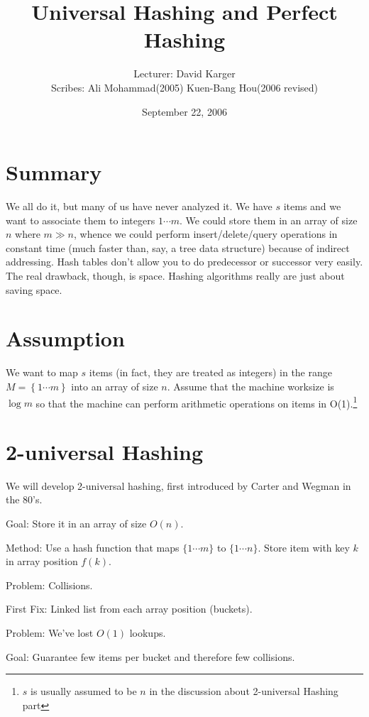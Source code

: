 \documentclass{article}
\begin{document}
\newcommand{\mod}{\hbox{mod }}

\title{Universal Hashing and Perfect Hashing}
\date{September 22, 2006}
\author{Lecturer: David Karger\\ Scribes: Ali Mohammad(2005) Kuen-Bang Hou(2006 revised)}

\section{Summary}

We all do it, but many of us have never analyzed it.  We have $s$ items
and we want to associate them to integers $1\cdots m$.
We could store them in an array of size $n$ where $m \gg n$, whence we could perform
insert/delete/query operations in constant time (much faster than, say,
a tree data structure) because of indirect addressing.  Hash tables don't
allow you to do predecessor or successor very easily.  The real drawback,
though, is space.  Hashing algorithms really are just about saving space.

\section{Assumption}

We want to map $s$ items (in fact, they are treated as integers) in the range $M = \left\{ 1 \cdots m \right\}$ into an array of size $n$.
Assume that the machine worksize is $\log m$ so that the machine can perform arithmetic operations on items
in O(1).\footnote{$s$ is usually assumed to be $n$ in the discussion about 2-universal Hashing part}

\section{2-universal Hashing}

We will develop 2-universal hashing, first introduced by Carter and Wegman in the 80's.

Goal: Store it in an array of size $O(n)$.

Method: Use a hash function that maps $\{1 \cdots m\}$ to $\{1 \cdots n\}$.
Store item with key $k$ in array position $f(k)$.

Problem: Collisions.

First Fix: Linked list from each array position (buckets).

Problem: We've lost $O(1)$ lookups.

Goal: Guarantee few items per bucket and therefore few collisions.
\end{document}
